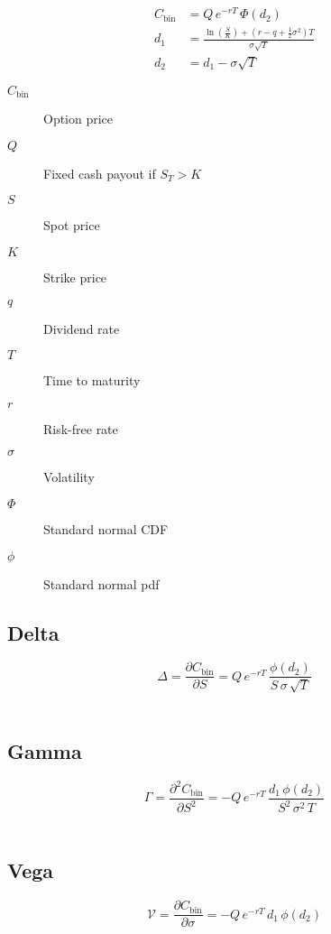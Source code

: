 \documentclass[12pt,a4paper]{article}
\begin{document}
\[
  \begin{aligned}
    C_{\mathrm{bin}} & = Q \, e^{-rT} \,\Phi(d_2) \\
    d_1 & = \frac{\ln\!\left(\tfrac{S}{K}\right) + (r - q + \tfrac{1}{2}\sigma^2)T}{\sigma \sqrt{T}} \\
    d_2 & = d_1 - \sigma \sqrt{T}
  \end{aligned}
\]

\begin{description}
  \item[$C_{\mathrm{bin}}$] Option price
  \item[$Q$] Fixed cash payout if \( S_T > K \)
  \item[$S$] Spot price
  \item[$K$] Strike price
  \item[$q$] Dividend rate
  \item[$T$] Time to maturity
  \item[$r$] Risk-free rate
  \item[$\sigma$] Volatility
  \item[$\Phi$] Standard normal CDF
  \item[$\phi$] Standard normal pdf
\end{description}

\subsection{Delta}
\[
  \boxed{\Delta = \frac{\partial C_{\mathrm{bin}}}{\partial S} 
  = Q\, e^{-rT}\, \frac{\phi(d_2)}{S\,\sigma\,\sqrt{T}}}
\]

\[
  \begin{aligned}
  \end{aligned}
\]

\subsection{Gamma}
\[
  \boxed{\Gamma = \frac{\partial^2 C_{\mathrm{bin}}}{\partial S^2} 
  = -Q\, e^{-rT}\, \frac{d_1\,\phi(d_2)}{S^2\,\sigma^2\,T}}
\]

\[
  \begin{aligned}
  \end{aligned}
\]

\subsection{Vega}
\[
  \boxed{\mathcal{V} = \frac{\partial C_{\mathrm{bin}}}{\partial \sigma} 
  = -Q\, e^{-rT}\, d_1\,\phi(d_2)}
\]
\end{document}
